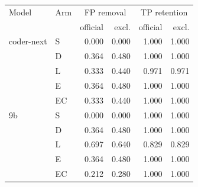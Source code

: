 \begin{tabular}{llrrrr}
\toprule
Model & Arm & \multicolumn{2}{c}{FP removal} & \multicolumn{2}{c}{TP retention} \\
 & & official & excl. & official & excl. \\
\midrule
coder-next & S & 0.000 & 0.000 & 1.000 & 1.000 \\
 & D & 0.364 & 0.480 & 1.000 & 1.000 \\
 & L & 0.333 & 0.440 & 0.971 & 0.971 \\
 & E & 0.364 & 0.480 & 1.000 & 1.000 \\
 & EC & 0.333 & 0.440 & 1.000 & 1.000 \\
\midrule
9b & S & 0.000 & 0.000 & 1.000 & 1.000 \\
 & D & 0.364 & 0.480 & 1.000 & 1.000 \\
 & L & 0.697 & 0.640 & 0.829 & 0.829 \\
 & E & 0.364 & 0.480 & 1.000 & 1.000 \\
 & EC & 0.212 & 0.280 & 1.000 & 1.000 \\
\bottomrule
\end{tabular}
